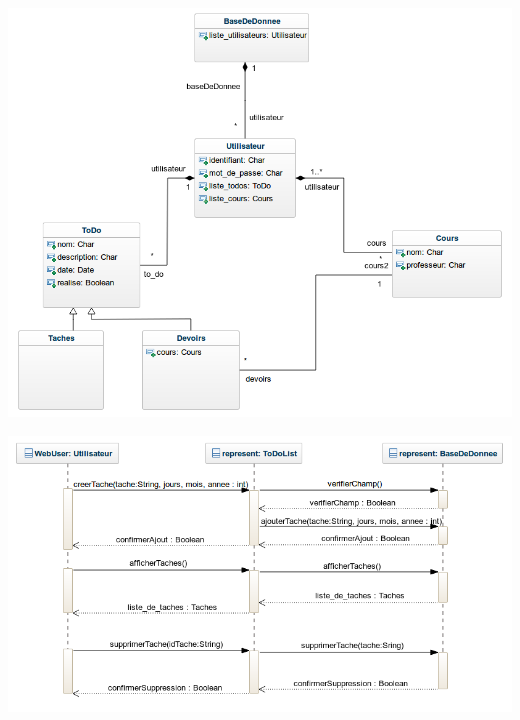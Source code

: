 \documentclass[french]{beamer}
\begin{document}
\begin{frame}
  \begin{center}
  \begin{minipage}[c]{0.6\linewidth}%
   \includegraphics[width=1\linewidth]{dcp}  %
  \end{minipage}
\end{center}
\end{frame}

\begin{frame}
  \begin{center}
  \begin{minipage}[c]{0.6\linewidth}%
   \includegraphics[width=1\linewidth]{dsa}  %
  \end{minipage}
\end{center}
\end{frame}
\end{document}
